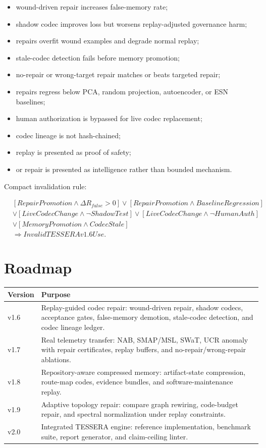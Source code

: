 \documentclass[12pt]{article}
\begin{document}
\begin{itemize}
\item wound-driven repair increases false-memory rate;
\item shadow codec improves loss but worsens replay-adjusted governance harm;
\item repairs overfit wound examples and degrade normal replay;
\item stale-codec detection fails before memory promotion;
\item no-repair or wrong-target repair matches or beats targeted repair;
\item repairs regress below PCA, random projection, autoencoder, or ESN baselines;
\item human authorization is bypassed for live codec replacement;
\item codec lineage is not hash-chained;
\item replay is presented as proof of safety;
\item or repair is presented as intelligence rather than bounded mechanism.
\end{itemize}

Compact invalidation rule:

\[
\begin{aligned}
&[RepairPromotion\wedge \Delta R_{false}>0]
\vee [RepairPromotion\wedge BaselineRegression]\\
&\vee [LiveCodecChange\wedge \neg ShadowTest]
\vee [LiveCodecChange\wedge \neg HumanAuth]\\
&\vee [MemoryPromotion\wedge CodecStale]\\
&\Rightarrow InvalidTESSERAv1.6Use.
\end{aligned}
\]

\section{Roadmap}

\begin{longtable}{p{}p{}}
\toprule
\textbf{Version} & \textbf{Purpose} \\
\midrule
v1.6 & Replay-guided codec repair: wound-driven repair, shadow codecs,
acceptance gates, false-memory demotion, stale-codec detection, and codec
lineage ledger. \\
v1.7 & Real telemetry transfer: NAB, SMAP/MSL, SWaT, UCR anomaly with repair
certificates, replay buffers, and no-repair/wrong-repair ablations. \\
v1.8 & Repository-aware compressed memory: artifact-state compression, route-map
codes, evidence bundles, and software-maintenance replay. \\
v1.9 & Adaptive topology repair: compare graph rewiring, code-budget repair, and
spectral normalization under replay constraints. \\
v2.0 & Integrated TESSERA engine: reference implementation, benchmark suite,
report generator, and claim-ceiling linter. \\
\bottomrule
\end{longtable}
\end{document}

